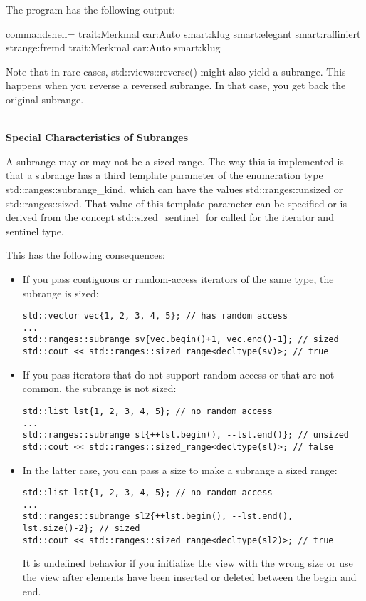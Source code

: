 The program has the following output:

{\footnotesize
\begin{tcblisting}{commandshell={}}
trait:Merkmal car:Auto smart:klug smart:elegant smart:raffiniert strange:fremd
trait:Merkmal car:Auto smart:klug
\end{tcblisting}
}

Note that in rare cases, std::views::reverse() might also yield a subrange. This happens when you reverse a reversed subrange. In that case, you get back the original subrange.


\noindent
\hspace*{\fill} \\ %
\textbf{Special Characteristics of Subranges}

A subrange may or may not be a sized range. The way this is implemented is that a subrange has a third template parameter of the enumeration type std::ranges::subrange\_kind, which can have the values std::ranges::unsized or std::ranges::sized. That value of this template parameter can be specified or is derived from the concept std::sized\_sentinel\_for called for the iterator and sentinel type.

This has the following consequences:

\begin{itemize}
\item
If you pass contiguous or random-access iterators of the same type, the subrange is sized:

\begin{lstlisting}[style=styleCXX]
std::vector vec{1, 2, 3, 4, 5}; // has random access
...
std::ranges::subrange sv{vec.begin()+1, vec.end()-1}; // sized
std::cout << std::ranges::sized_range<decltype(sv)>; // true
\end{lstlisting}

\item
If you pass iterators that do not support random access or that are not common, the subrange is not sized:

\begin{lstlisting}[style=styleCXX]
std::list lst{1, 2, 3, 4, 5}; // no random access
...
std::ranges::subrange sl{++lst.begin(), --lst.end()}; // unsized
std::cout << std::ranges::sized_range<decltype(sl)>; // false
\end{lstlisting}

\item
In the latter case, you can pass a size to make a subrange a sized range:

\begin{lstlisting}[style=styleCXX]
std::list lst{1, 2, 3, 4, 5}; // no random access
...
std::ranges::subrange sl2{++lst.begin(), --lst.end(), lst.size()-2}; // sized
std::cout << std::ranges::sized_range<decltype(sl2)>; // true
\end{lstlisting}

It is undefined behavior if you initialize the view with the wrong size or use the view after elements have been inserted or deleted between the begin and end.
\end{itemize}

